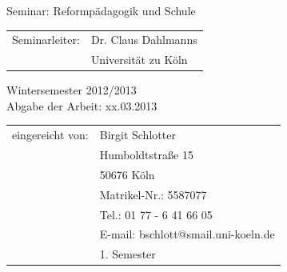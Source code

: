 \begin{titlepage}
\begin{center}

\begin{large}
Seminar: Reformpädagogik und Schule\\ [0.8em]
\end{large}


\begin{tabular}{rl}
        Seminarleiter:  &  Dr. Claus Dahlmanns\\
       			       &  \small Universität zu Köln \\[0.8em]
\end{tabular}
							  
\begin{large}
Wintersemester 2012/2013\\
Abgabe der Arbeit: xx.03.2013\\
\end{large}

\vspace{1.7cm}




\begin{tabular}{rl}
        eingereicht von:  &  Birgit Schlotter\\
       			    	  &  Humboldtstraße 15\\
			      		  &  50676 Köln\\
			      		  &  Matrikel-Nr.: 5587077\\
						  &  Tel.: 01 77 - 6 41 66 05\\
						  &  E-mail: bschlott@smail.uni-koeln.de\\
						  &  1. Semester\\[0.8em]
\end{tabular}



%						
							
							
			
							
							
\end{center}

\end{titlepage}
